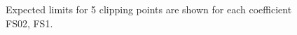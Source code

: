 \begin{figure}[ht]
    \centering
        \caption{Expected limits for 5 clipping points are shown for each coefficient FS02, FS1.}
\end{figure}



